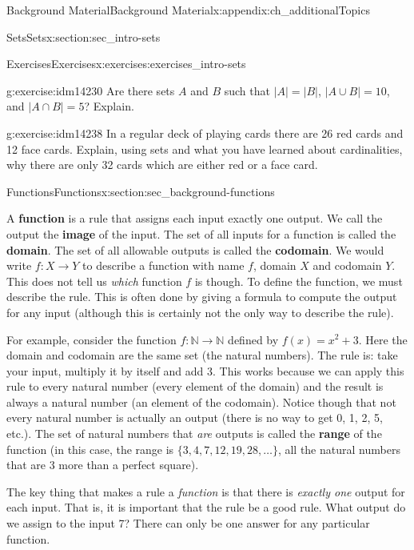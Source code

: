 \documentclass[oneside,10pt,]{book}
\newcommand{\terminology}[1]{\textbf{#1}}
\numberwithin{equation}{chapter}
\def\N{\mathbb N}
\begin{document}
\begin{appendixptx}{Background Material}{}{Background Material}{}{}{x:appendix:ch_additionalTopics}
\begin{sectionptx}{Sets}{}{Sets}{}{}{x:section:sec_intro-sets}
\begin{exercises-subsection}{Exercises}{}{Exercises}{}{}{x:exercises:exercises_intro-sets}
\begin{divisionexercise}{15}{}{}{g:exercise:idm14230}
Are there sets \(A\) and \(B\) such that \(|A| = |B|\), \(|A\cup B| = 10\), and \(|A\cap B| = 5\)? Explain.%
\end{divisionexercise}%
\begin{divisionexercise}{16}{}{}{g:exercise:idm14238}%
In a regular deck of playing cards there are 26 red cards and 12 face cards. Explain, using sets and what you have learned about cardinalities, why there are only 32 cards which are either red or a face card.%
\end{divisionexercise}%
\end{exercises-subsection}
\end{sectionptx}
%
%
\typeout{************************************************}
\typeout{************************************************}
%
\begin{sectionptx}{Functions}{}{Functions}{}{}{x:section:sec_background-functions}
\(\textit{}\)\begin{introduction}{}%
A \terminology{function} is a rule that assigns each input exactly one output.  We call the output the \terminology{image} of the input.  The set of all inputs for a function is called the \terminology{domain}. The set of all allowable outputs is called the \terminology{codomain}. We would write \(f:X \to Y\) to describe a function with name \(f\), domain \(X\) and codomain \(Y\). This does not tell us \emph{which} function \(f\) is though. To define the function, we must describe the rule. This is often done by giving a formula to compute the output for any input (although this is certainly not the only way to describe the rule).%
\par
For example, consider the function \(f:\N \to \N\) defined by \(f(x) = x^2 + 3\). Here the domain and codomain are the same set (the natural numbers). The rule is: take your input, multiply it by itself and add 3. This works because we can apply this rule to every natural number (every element of the domain) and the result is always a natural number (an element of the codomain). Notice though that not every natural number is actually an output (there is no way to get 0, 1, 2, 5, etc.). The set of natural numbers that \emph{are} outputs is called the \terminology{range} of the function (in this case, the range is \(\{3, 4, 7, 12, 19, 28, \ldots\}\), all the natural numbers that are 3 more than a perfect square).%
\par
The key thing that makes a rule a \emph{function} is that there is \emph{exactly one} output for each input. That is, it is important that the rule be a good rule. What output do we assign to the input 7? There can only be one answer for any particular function.%

\end{introduction}
\end{sectionptx}
\end{appendixptx}
\end{document}
